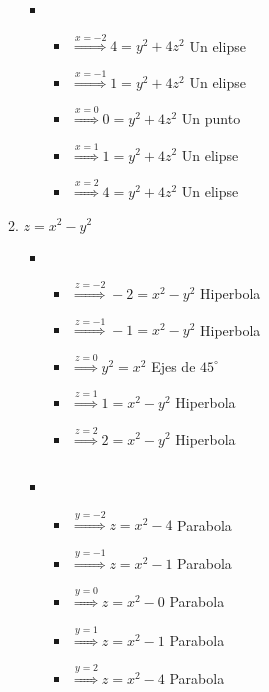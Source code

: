 \documentclass[../practica_02.tex]{subfiles}
\begin{document}
\begin{enumerate}
\begin{enumerate}
\begin{itemize}
                        \item
                            \begin{itemize}
                                \item $\stackrel{x=-2}{\Rightarrow} 4 = y^2 + 4z^2 $ Un elipse
                                \item $\stackrel{x=-1}{\Rightarrow} 1 = y^2 + 4z^2 $ Un elipse
                                \item $\stackrel{x=0}{\Rightarrow}  0 = y^2 + 4z^2 $ Un punto
                                \item $\stackrel{x=1}{\Rightarrow}  1 = y^2 + 4z^2 $ Un elipse
                                \item $\stackrel{x=2}{\Rightarrow}  4 = y^2 + 4z^2 $ Un elipse
                            \end{itemize}

                    \end{itemize}

                \item $z = x^2 - y^2$

                    \begin{itemize}
                        \item
                            \begin{itemize}
                                \item $\stackrel{z=-2}{\Rightarrow} -2 = x^2 - y^2 $ Hiperbola
                                \item $\stackrel{z=-1}{\Rightarrow} -1 = x^2 - y^2 $ Hiperbola
                                \item $\stackrel{z=0}{\Rightarrow} y^2 = x^2       $ Ejes de $45^\circ$
                                \item $\stackrel{z=1}{\Rightarrow}   1 = x^2 - y^2 $ Hiperbola
                                \item $\stackrel{z=2}{\Rightarrow}   2 = x^2 - y^2 $ Hiperbola
                            \end{itemize}

                        $ $

                        \item
                            \begin{itemize}
                                \item $\stackrel{y=-2}{\Rightarrow} z = x^2 - 4 $ Parabola
                                \item $\stackrel{y=-1}{\Rightarrow} z = x^2 - 1 $ Parabola
                                \item $\stackrel{y=0}{\Rightarrow}  z = x^2 - 0 $ Parabola
                                \item $\stackrel{y=1}{\Rightarrow}  z = x^2 - 1 $ Parabola
                                \item $\stackrel{y=2}{\Rightarrow}  z = x^2 - 4 $ Parabola
                            \end{itemize}


\end{itemize}
\end{enumerate}
\end{enumerate}
\end{document}

